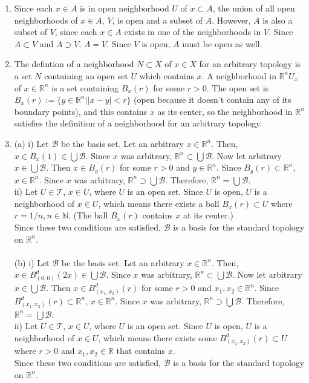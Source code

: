 \documentclass{article}
\begin{document}
\begin{enumerate}
\item
Since each $x \in A$ is in open neighborhood $U$ of $x \subset A$, the union of all open neighborhoods of $x \in A$, $V$, is open and a subset of $A$. However, $A$ is also a subset of $V$, since each $x \in A$ exists in one of the neighborhoods in $V$. Since $A \subset V$ and $A \supset V$, $A = V$. Since $V$ is open, $A$ must be open as well.

\item
The defintion of a neighborhood $N \subset X$ of $x\in X$ for an arbitrary topology is a set $N$ containing an open set $U$ which contains $x$. A neighborhood in $\mathbb{R}^n U_x$ of $x \in \mathbb{R}^n$ is a set containing $B_x(r)$ for some $r > 0$. The open set is $B_x(r) := \{y \in \mathbb{R}^n| |x-y|<r \}$ 
(open because it doesn't contain any of its boundary points), and this contains $x$ as its center, so the neighborhood in $\mathbb{R}^n$ satisfies the definition of a neighborhood for an arbitrary topology.

\item
(a) i) Let $\mathcal{B}$ be the basis set. Let an arbitrary $x \in \mathbb{R}^n$. Then, $x \in B_x(1) \in \bigcup \mathcal{B}$. Since $x$ was arbitrary, $\mathbb{R}^n \subset \bigcup \mathcal{B}$. Now let arbitrary $x \in \bigcup \mathcal{B}$. Then $x\in B_y(r)$ for some $r > 0 $ and $y \in \mathbb{R}^n$. Since $B_y(r) \subset\mathbb{R}^n$, $x \in \mathbb{R}^n$. Since $x$ was arbitrary, $\mathbb{R}^n \supset \bigcup \mathcal{B}$. Therefore, $\mathbb{R}^n = \bigcup \mathcal{B}$.
\\ii) Let $U \in \mathcal{T}$, $x\in U$, where $U$ is an open set. Since $U$ is open, $U$ is a neighborhood of $x \in U$, which means there exists a ball $B_x(r) \subset U$ where $r = 1/n, n \in \mathbb{N}$. (The ball $B_x(r)$ contains $x$ at its center.)
\\Since these two conditions are satisfied, $\mathcal{B}$ is a basis for the standard topology on $\mathbb{R}^n$.
\\\\(b) i) Let $\mathcal{B}$ be the basis set. Let an arbitrary $x \in \mathbb{R}^n$. Then, $x \in B^d_{(0,0)}(2x) \in \bigcup \mathcal{B}$. Since $x$ was arbitrary, $\mathbb{R}^n \subset \bigcup \mathcal{B}$. Now let arbitrary $x \in \bigcup \mathcal{B}$. Then $x\in B^d_{(x_1,x_2)}(r)$ for some $r > 0 $ and $x_1,x_2 \in \mathbb{R}^n$. Since $B^d_{(x_1,x_2)}(r) \subset\mathbb{R}^n$, $x \in \mathbb{R}^n$. Since $x$ was arbitrary, $\mathbb{R}^n \supset \bigcup \mathcal{B}$. Therefore, $\mathbb{R}^n = \bigcup \mathcal{B}$.
\\ii) Let $U \in \mathcal{T}$, $x\in U$, where $U$ is an open set. Since $U$ is open, $U$ is a neighborhood of $x \in U$, which means there exists some $B^d_{(x_1,x_2)}(r) \subset U$ where $r > 0$ and $x_1,x_2 \in \mathbb{R}$ that contains $x$. 
\\Since these two conditions are satisfied, $\mathcal{B}$ is a basis for the standard topology on $\mathbb{R}^n$.

\end{enumerate}
\end{document}
